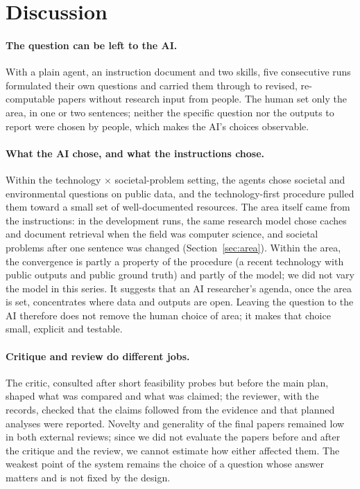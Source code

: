 \documentclass[11pt]{article}
\begin{document}
\section{Discussion}
\label{sec:discussion}

\paragraph{The question can be left to the AI.} With a plain agent, an instruction document and two skills, five consecutive runs formulated their own questions and carried them through to revised, re-computable papers without research input from people. The human set only the area, in one or two sentences; neither the specific question nor the outputs to report were chosen by people, which makes the AI's choices observable.

\paragraph{What the AI chose, and what the instructions chose.} Within the technology $\times$ societal-problem setting, the agents chose societal and environmental questions on public data, and the technology-first procedure pulled them toward a small set of well-documented resources. The area itself came from the instructions: in the development runs, the same research model chose caches and document retrieval when the field was computer science, and societal problems after one sentence was changed (Section~\ref{sec:area}). Within the area, the convergence is partly a property of the procedure (a recent technology with public outputs and public ground truth) and partly of the model; we did not vary the model in this series. It suggests that an AI researcher's agenda, once the area is set, concentrates where data and outputs are open. Leaving the question to the AI therefore does not remove the human choice of area; it makes that choice small, explicit and testable.

\paragraph{Critique and review do different jobs.} The critic, consulted after short feasibility probes but before the main plan, shaped what was compared and what was claimed; the reviewer, with the records, checked that the claims followed from the evidence and that planned analyses were reported. Novelty and generality of the final papers remained low in both external reviews; since we did not evaluate the papers before and after the critique and the review, we cannot estimate how either affected them. The weakest point of the system remains the choice of a question whose answer matters and is not fixed by the design.
\end{document}
